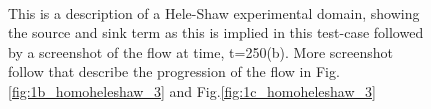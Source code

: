 \documentclass[preprint,authoryear,12pt]{elsarticle}
\begin{document}
\begin{figure}
\centering
{}\\[2mm]%
%
\caption{This is a description of a Hele-Shaw experimental domain, showing the source and sink term as this is implied in this test-case followed by a screenshot of the flow at time, t=250(b). More screenshot follow that describe the progression of the flow in Fig.\ref{fig:1b_homoheleshaw_3} and Fig.\ref{fig:1c_homoheleshaw_3}}
\label{fig:1a_homoheleshaw_3}
\end{figure}
\end{document}
